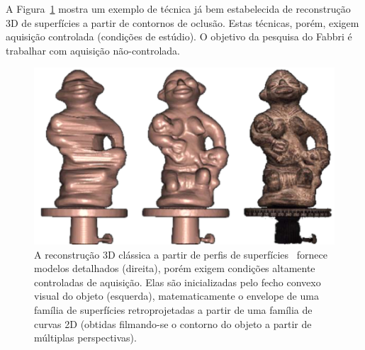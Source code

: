 \documentclass[a4paper,titlepage]{article}
\begin{document}
A Figura~\ref{fig:multiview:stereo} mostra um exemplo de técnica já bem
estabelecida de reconstrução 3D de superfícies a partir de contornos de oclusão.
Estas técnicas, porém, exigem aquisição controlada (condições de estúdio).
O objetivo da pesquisa do Fabbri é trabalhar com aquisição não-controlada.
\begin{figure}
\begin{center}
  \includegraphics[width=0.5\linewidth]{figs/multiview-stereo-white.png}
\end{center}
   \caption{
A reconstrução 3D clássica a partir de perfis de superfícies~\cite{Hernandez:Schmitt:CVIU04}
fornece modelos detalhados (direita), porém exigem condições altamente
controladas de aquisição. Elas são inicializadas pelo fecho convexo visual do
objeto (esquerda), matematicamente o envelope de uma família de superfícies retroprojetadas a
partir de uma família de curvas 2D (obtidas filmando-se o contorno do objeto a
partir de múltiplas perspectivas).
}
\label{fig:multiview:stereo}
\end{figure}


\end{document}
